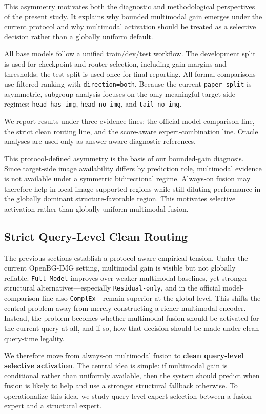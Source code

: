 \documentclass[11pt]{article}
\begin{document}
This asymmetry motivates both the diagnostic and methodological perspectives of the present study. It explains why bounded multimodal gain emerges under the current protocol and why multimodal activation should be treated as a selective decision rather than a globally uniform default.

All base models follow a unified train/dev/test workflow. The development split is used for checkpoint and router selection, including gain margins and thresholds; the test split is used once for final reporting. All formal comparisons use filtered ranking with \texttt{direction=both}. Because the current \texttt{paper\_split} is asymmetric, subgroup analysis focuses on the only meaningful target-side regimes: \texttt{head\_has\_img}, \texttt{head\_no\_img}, and \texttt{tail\_no\_img}.

We report results under three evidence lines: the official model-comparison line, the strict clean routing line, and the score-aware expert-combination line. Oracle analyses are used only as answer-aware diagnostic references.

This protocol-defined asymmetry is the basis of our bounded-gain diagnosis. Since target-side image availability differs by prediction role, multimodal evidence is not available under a symmetric bidirectional regime. Always-on fusion may therefore help in local image-supported regions while still diluting performance in the globally dominant structure-favorable region. This motivates selective activation rather than globally uniform multimodal fusion.

\subsection{Strict Query-Level Clean Routing}
The previous sections establish a protocol-aware empirical tension. Under the current OpenBG-IMG setting, multimodal gain is visible but not globally reliable. \texttt{Full Model} improves over weaker multimodal baselines, yet stronger structural alternatives---especially \texttt{Residual-only}, and in the official model-comparison line also \texttt{ComplEx}---remain superior at the global level. This shifts the central problem away from merely constructing a richer multimodal encoder. Instead, the problem becomes whether multimodal fusion should be activated for the current query at all, and if so, how that decision should be made under clean query-time legality.

We therefore move from always-on multimodal fusion to \textbf{clean query-level selective activation}. The central idea is simple: if multimodal gain is conditional rather than uniformly available, then the system should predict when fusion is likely to help and use a stronger structural fallback otherwise. To operationalize this idea, we study query-level expert selection between a fusion expert and a structural expert.
\end{document}
